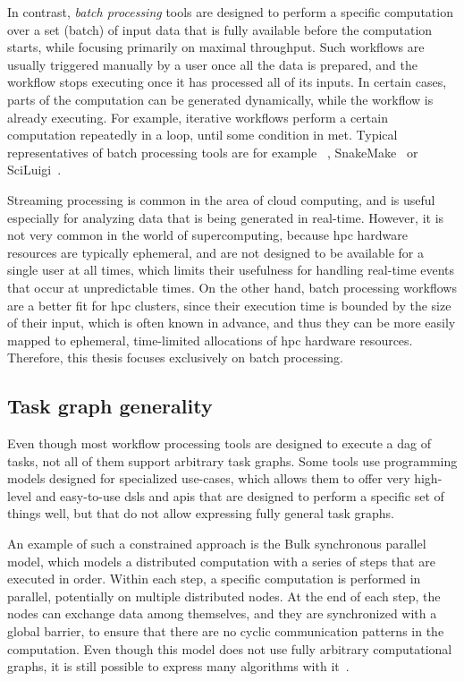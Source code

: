 In contrast, \emph{batch processing} tools are designed to perform a specific computation over a
set (batch) of input data that is fully available before the computation starts, while focusing
primarily on maximal throughput. Such workflows are usually triggered manually by a user once all
the data is prepared, and the workflow stops executing once it has processed all of its inputs. In
certain cases, parts of the computation can be generated dynamically, while the workflow is already
executing. For example, iterative workflows perform a certain computation repeatedly in a loop,
until some condition in met. Typical representatives of batch processing tools are for example
\dask{}~\cite{dask}, SnakeMake~\cite{snakemake} or
SciLuigi~\cite{sciluigi}.

Streaming processing is common in the area of cloud computing, and is useful especially for
analyzing data that is being generated in real-time. However, it is not very common in the world of
supercomputing, because \gls{hpc} hardware resources are typically ephemeral,
and are not designed to be available for a single user at all times, which limits their
usefulness for handling real-time events that occur at unpredictable times. On the other hand,
batch processing workflows are a better fit for \gls{hpc} clusters, since their
execution time is bounded by the size of their input, which is often known in advance, and thus
they can be more easily mapped to ephemeral, time-limited allocations of \gls{hpc}
hardware resources. Therefore, this thesis focuses exclusively on batch processing.

\subsection{Task graph generality}
Even though most workflow processing tools are designed to execute a
\gls{dag} of tasks, not all of them support arbitrary task graphs. Some tools use
programming models designed for specialized use-cases, which allows them to offer very high-level
and easy-to-use \glspl{dsl} and \glspl{api} that are designed to perform a
specific set of things well, but that do not allow expressing fully general task graphs.

An example of such a constrained approach is the Bulk synchronous parallel~\cite{bulkparallel1}
model, which models a distributed computation with a series of steps that are executed in order.
Within each step, a specific computation is performed in parallel, potentially on multiple
distributed nodes. At the end of each step, the nodes can exchange data among themselves, and
they are synchronized with a global barrier, to ensure that there are no cyclic communication
patterns in the computation. Even though this model does not use fully arbitrary computational
graphs, it is still possible to express many algorithms with it~\cite{bulkparallel2}.

